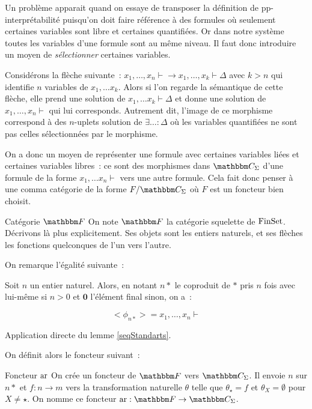 Un problème apparait quand on essaye de transposer la définition de pp-interprétabilité
puisqu'on doit faire référence à des formules où seulement certaines variables sont
libre et certaines quantifiées. Or dans notre système toutes les variables d'une
formule sont au même niveau. Il faut donc introduire un moyen de \emph{sélectionner}
certaines variables.

Considérons la flèche suivante~:
$x_1,\dots, x_n\vdash \rightarrow x_1,\dots, x_k\vdash\Delta$ avec $k>n$ qui identifie
$n$ variables de $x_1,\dots x_k$. Alors si l'on regarde la sémantique de cette flèche,
elle prend une solution de $x_1,\dots x_k\vdash\Delta$ et donne une solution de
$x_1,\dots, x_n\vdash$ qui lui corresponds. Autrement dit, l'image de ce morphisme
correspond à des $n$-uplets solution de $\exists \dots:\Delta$ où les variables
quantifiées ne sont pas celles sélectionnées par le morphisme.

On a donc un moyen de représenter une formule avec certaines variables liées et certaines
variables libres~: ce sont des morphismes dans $\C_\Sigma$ d'une formule de la forme
$x_1,\dots x_n\vdash$ vers une autre formule. Cela fait donc penser à une comma
catégorie de la forme $F/\C_\Sigma$ où $F$ est un foncteur bien choisit.

\begin{defi}{Catégorie $\cf$}
    On note $\cf$ la catégorie squelette de $\text{FinSet}$. Décrivons là plus explicitement.
    Ses objets sont les entiers naturels, et ses flèches les fonctions quelconques
    de l'un vers l'autre.
\end{defi}

On remarque l'égalité suivante~:

\begin{lem}
    Soit $n$ un entier naturel. Alors, en notant $n\ast$ le coproduit de $\ast$ pris
    $n$ fois avec lui-même si $n>0$ et $\mathbf{0}$ l'élément final sinon, on
    a~:

    \[ <\phi_{n\ast}> = x_1,\dots, x_n\vdash \]
\end{lem}

\begin{pv}
    Application directe du lemme \ref{seqStandarts}.
\end{pv}

On définit alors le foncteur suivant~:

\begin{defi}{Foncteur $\text{ar}$}
    On crée un foncteur de $\cf$ vers $\C_\Sigma$. Il envoie $n$ sur $n\ast$ et
    $f : n\rightarrow m$ vers la transformation naturelle $\theta$ telle que
    $\theta_\star = f$ et $\theta_X = \emptyset$ pour $X\neq\star$. On nomme ce
    foncteur $\arf : \cf\rightarrow\C_\Sigma$.
\end{defi}

